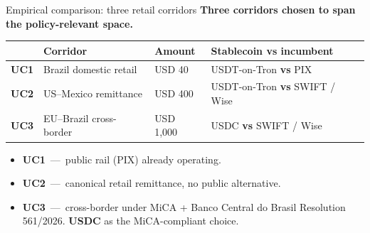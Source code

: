 \documentclass[aspectratio=169,11pt]{beamer}
\begin{document}
\begin{frame}{Empirical comparison: three retail corridors}
\textbf{Three corridors chosen to span the policy-relevant space.}

\bigskip

\begin{center}
\renewcommand{\arraystretch}{1.4}
\begin{tabular}{llll}
\toprule
& \textbf{Corridor} & \textbf{Amount} & \textbf{Stablecoin vs incumbent} \\
\midrule
\textbf{UC1} & Brazil domestic retail   & USD 40        & USDT-on-Tron \;\textbf{vs}\; PIX \\
\textbf{UC2} & US--Mexico remittance    & USD 400       & USDT-on-Tron \;\textbf{vs}\; SWIFT / Wise \\
\textbf{UC3} & EU--Brazil cross-border  & USD 1{,}000   & USDC \;\textbf{vs}\; SWIFT / Wise \\
\bottomrule
\end{tabular}
\end{center}

\bigskip

\small
\begin{itemize}
  \item \textbf{UC1} \,---\, public rail (PIX) already operating.
  \item \textbf{UC2} \,---\, canonical retail remittance, no public alternative.
  \item \textbf{UC3} \,---\, cross-border under MiCA + Banco Central do Brasil Resolution 561/2026. \textbf{USDC} as the MiCA-compliant choice.
\end{itemize}
\end{frame}
\end{document}
